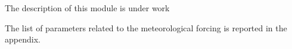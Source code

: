 The description of this module is under work

The list of parameters related to the meteorological forcing is reported in the
appendix.

